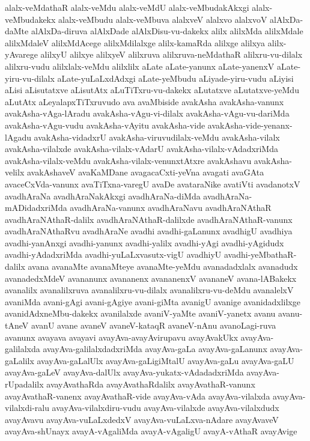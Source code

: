 {alalx-veMdathaR
alalx-veMdu
alalx-veMdU
alalx-veMbudakAkxgi
alalx-veMbudakekx
alalx-veMbudu
alalx-veMbuva
alalxveV
alalxvo
alalxvoV
alAlxDa-daMte
alAlxDa-diruva
alAlxDade
alAlxDisu-vu-dakekx
alilx
alilxMda
alilxMdale
alilxMdaleV
alilxMdAcege
alilxMdilalxge
alilx-kamaRda
alilxge
alilxya
alilx-yAvarege
alilxyU
alilxye
alilxyeV
alilxruva
alilxruva-neMdathaR
alilxru-vu-dilalx
alilxru-vudu
alilxlalx-veMdu
alilxlilx
aLate
aLate-yanunx
aLate-yanenxV
aLate-yiru-vu-dilalx
aLate-yuLaLxdAdxgi
aLate-yeMbudu
aLiyade-yiru-vudu
aLiyisi
aLisi
aLisutatxve
aLisutAtx
aLuTiTxru-vu-dakekx
aLutatxve
aLutatxve-yeMdu
aLutAtx
aLeyalapxTiTxruvudo
ava
avaMbiside
avakAsha
avakAsha-vanunx
avakAsha-vAga-lAradu
avakAsha-vAgu-vi-dilalx
avakAsha-vAgu-vu-dariMda
avakAsha-vAgu-vudu
avakAsha-vAyitu
avakAsha-vide
avakAsha-vide-yenanx-lAgadu
avakAsha-vidadxrU
avakAsha-viruvudilalx-veMdu
avakAsha-vilalx
avakAsha-vilalxde
avakAsha-vilalx-vAdarU
avakAsha-vilalx-vAdadxriMda
avakAsha-vilalx-veMdu
avakAsha-vilalx-venunxtAtxre
avakAshavu
avakAsha-velilx
avakAshaveV
avaKaMDane
avagacaCxti-yeVna
avagati
avaGAta
avaceCxVda-vanunx
avaTiTxna-varegU
avaDe
avataraNike
avatiVti
avadanotxV
avadhAraNa
avadhAraNakAkxgi
avadhAraNa-diMda
avadhAraNa-mADidadxriMda
avadhAraNa-vanunx
avadhAraNavu
avadhAraNAthaR
avadhAraNAthaR-dalilx
avadhAraNAthaR-dalilxde
avadhAraNAthaR-vanunx
avadhAraNAthaRvu
avadhAraNe
avadhi
avadhi-gaLanunx
avadhigU
avadhiya
avadhi-yanAnxgi
avadhi-yanunx
avadhi-yalilx
avadhi-yAgi
avadhi-yAgidudx
avadhi-yAdadxriMda
avadhi-yuLaLxvasutx-vigU
avadhiyU
avadhi-yeMbathaR-dalilx
avana
avanaMte
avanaMteye
avanaMte-yeMdu
avanadadxlalx
avanadudx
avanadedxMdeV
avananunx
avananenx
avananenxV
avananeV
avana-lABakekx
avanalilx
avanalilxruva
avanalilxru-vu-dilalx
avanalilxru-vu-deMdu
avanalelxV
avaniMda
avani-gAgi
avani-gAgiye
avani-giMta
avanigU
avanige
avanidadxlilxge
avanidAdxneMbu-dakekx
avanilalxde
avaniV-yaMte
avaniV-yanetx
avanu
avanu-tAneV
avanU
avane
avaneV
avaneV-kataqR
avaneV-nAnu
avanoLagi-ruva
avanunx
avayava
avayavi
avayAva-avayAvirupavu
avayAvakUkx
avayAva-galilalxda
avayAva-galilalxdadxriMda
avayAva-gaLa
avayAva-gaLanunx
avayAva-gaLalilx
avayAva-gaLalUlx
avayAva-gaLigiMtalU
avayAva-gaLu
avayAva-gaLU
avayAva-gaLeV
avayAva-dalUlx
avayAva-yukatx-vAdadadxriMda
avayAva-rUpadalilx
avayAvathaRda
avayAvathaRdalilx
avayAvathaR-vanunx
avayAvathaR-vanenx
avayAvathaR-vide
avayAva-vAda
avayAva-vilalxda
avayAva-vilalxdi-ralu
avayAva-vilalxdiru-vudu
avayAva-vilalxde
avayAva-vilalxdudx
avayAvavu
avayAva-vuLaLxdedxV
avayAva-vuLaLxva-nAdare
avayAvaveV
avayAva-shUnayx
avayA-vAgaliMda
avayA-vAgaligU
avayA-vAthaR
avayAvige
}
